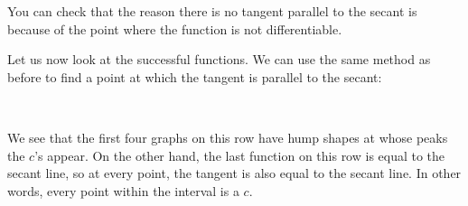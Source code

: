 \documentclass[pdftex, brazil, 12pt, twoside]{article}
\begin{document}
\begin{figure}[H]
  \begin{center}
    \label{fig:mvt-hypot-8}
  \end{center}
\end{figure}

You can check that the reason there
is no tangent parallel to the secant
is because of the point where the function is not
differentiable.

Let us now look at the successful functions.
We can use the same method as before
to find a point at which the tangent is parallel
to the secant:

\begin{figure}[H]
  \begin{center}
    \label{fig:mvt-hypot-9}
    \\
  \end{center}
\end{figure}

We see that the first four graphs on this row
have hump shapes at whose peaks the $c$'s appear.
On the other hand, the last function on this row
is equal to the secant line, so at every point,
the tangent is also equal to the secant line.
In other words, every point within the interval is a $c$.
\end{document}
